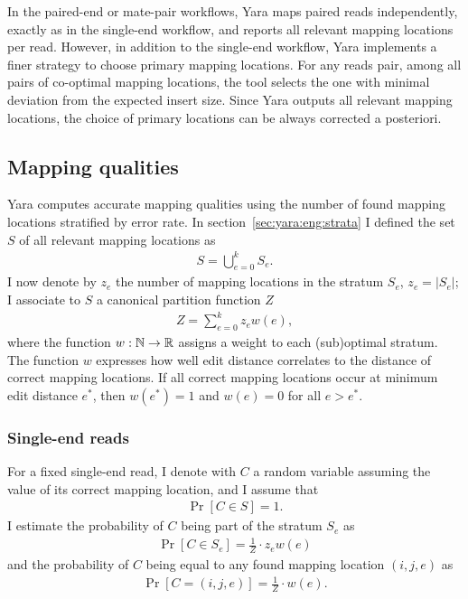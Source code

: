 In the paired-end or mate-pair workflows, Yara maps paired reads independently, exactly as in the single-end workflow, and reports all relevant mapping locations per read.
However, in addition to the single-end workflow, Yara implements a finer strategy to choose primary mapping locations.
For any reads pair, among all pairs of co-optimal mapping locations, the tool selects the one with minimal deviation from the expected insert size.
Since Yara outputs all relevant mapping locations, the choice of primary locations can be always corrected a posteriori.

\subsection{Mapping qualities}
\label{sec:yara:eng:qualities}
Yara computes accurate mapping qualities using the number of found mapping locations stratified by error rate.
In section~\ref{sec:yara:eng:strata} I defined the set $S$ of all relevant mapping locations as
\begin{eqnarray}
S = \bigcup_{e=0}^{k} S_e.
\end{eqnarray}
I now denote by $z_e$ the number of mapping locations in the stratum $S_e$, \ie $z_e=|S_e|$;
I associate to $S$ a canonical partition function $Z$
\begin{eqnarray}
\label{eq:yara:mqual:partition}
Z = \sum_{e=0}^{k} z_e w(e),
\end{eqnarray}
where the function $w : \mathbb {N} \rightarrow \mathbb {R}$ assigns a weight to each (sub)optimal stratum.
The function $w$ expresses how well edit distance correlates to the distance of correct mapping locations.
If all correct mapping locations occur at minimum edit distance $e^*$, then $w(e^*) = 1$ and $w(e) = 0$ for all $e > e^*$.

\subsubsection{Single-end reads}

For a fixed single-end read, I denote with $C$ a random variable assuming the value of its correct mapping location, and I assume that
\begin{eqnarray}
\Pr[C \in S] = 1.
\end{eqnarray}
I estimate the probability of $C$ being part of the stratum $S_e$ as
\begin{eqnarray}
\label{eq:yara:mqual:se:stratum}
\Pr[C \in S_e] = \frac{1}{Z} \cdot z_e w(e)
\end{eqnarray}
and the probability of $C$ being equal to any found mapping location $(i,j,e)$ as
\begin{eqnarray}
\label{eq:yara:mqual:se:location}
\Pr[C = (i,j,e)] = \frac{1}{Z} \cdot w(e).
\end{eqnarray}

